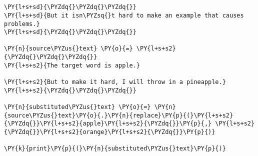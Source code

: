 

\section*{}

\begin{Verbatim}[commandchars=\\\{\}]
\PY{l+s+sd}{\PYZdq{}\PYZdq{}\PYZdq{}}
\PY{l+s+sd}{But it isn\PYZsq{}t hard to make an example that causes problems.}
\PY{l+s+sd}{\PYZdq{}\PYZdq{}\PYZdq{}}

\PY{n}{source\PYZus{}text} \PY{o}{=} \PY{l+s+s2}{\PYZdq{}\PYZdq{}\PYZdq{}}
\PY{l+s+s2}{The target word is apple.}

\PY{l+s+s2}{But to make it hard, I will throw in a pineapple.}
\PY{l+s+s2}{\PYZdq{}\PYZdq{}\PYZdq{}}

\PY{n}{substituted\PYZus{}text} \PY{o}{=} \PY{n}{source\PYZus{}text}\PY{o}{.}\PY{n}{replace}\PY{p}{(}\PY{l+s+s2}{\PYZdq{}}\PY{l+s+s2}{apple}\PY{l+s+s2}{\PYZdq{}}\PY{p}{,} \PY{l+s+s2}{\PYZdq{}}\PY{l+s+s2}{orange}\PY{l+s+s2}{\PYZdq{}}\PY{p}{)}

\PY{k}{print}\PY{p}{(}\PY{n}{substituted\PYZus{}text}\PY{p}{)}
\end{Verbatim}
